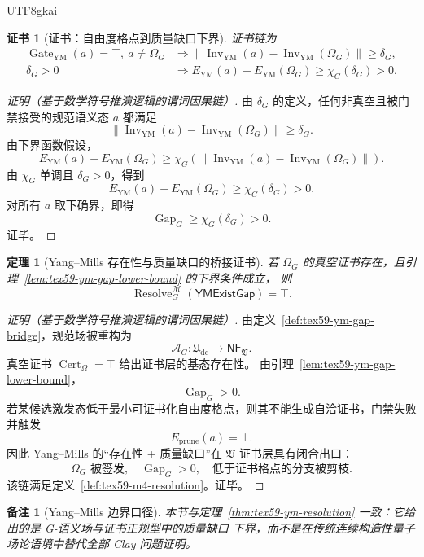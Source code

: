 \documentclass[12pt]{article}
\newtheorem{theorem}{定理}[section]
\newtheorem{remark}{备注}[section]
\newtheorem{Certificate}{证书}[section]
\newcommand{\Udc}{\mathfrak{U}_{\mathrm{dc}}}
\newcommand{\Vsys}{\mathfrak V}
\newcommand{\NF}{\mathsf{NF}}
\DeclareMathOperator{\Cert}{Cert}
\DeclareMathOperator{\Resolve}{Resolve}
\DeclareMathOperator{\Gate}{Gate}
\DeclareMathOperator{\Inv}{Inv}
\DeclareMathOperator{\Gap}{Gap}
\begin{document}
\begin{CJK*}{UTF8}{gkai}
\begin{Certificate}[证书：自由度格点到质量缺口下界]
\label{cert:tex59-ym-gap-lower-bound}
证书链为
\[
  \begin{aligned}
  \Gate_{\mathrm{YM}}(a)=\top,\ a\ne\Omega_G
  &\Longrightarrow
  \|\Inv_{\mathrm{YM}}(a)-\Inv_{\mathrm{YM}}(\Omega_G)\|\ge\delta_G,\\
  \delta_G>0
  &\Longrightarrow
  E_{\mathrm{YM}}(a)-E_{\mathrm{YM}}(\Omega_G)
  \ge\chi_G(\delta_G)>0.
  \end{aligned}
\]
\end{Certificate}

\begin{proof}[证明（基于数学符号推演逻辑的谓词因果链）]
由 \(\delta_G\) 的定义，任何非真空且被门禁接受的规范语义态 \(a\) 都满足
\[
  \|\Inv_{\mathrm{YM}}(a)-\Inv_{\mathrm{YM}}(\Omega_G)\|\ge\delta_G.
\]
由下界函数假设，
\[
  E_{\mathrm{YM}}(a)-E_{\mathrm{YM}}(\Omega_G)
  \ge
  \chi_G\left(
  \|\Inv_{\mathrm{YM}}(a)-\Inv_{\mathrm{YM}}(\Omega_G)\|
  \right).
\]
由 \(\chi_G\) 单调且 \(\delta_G>0\)，得到
\[
  E_{\mathrm{YM}}(a)-E_{\mathrm{YM}}(\Omega_G)\ge\chi_G(\delta_G)>0.
\]
对所有 \(a\) 取下确界，即得
\[
  \Gap_G\ge\chi_G(\delta_G)>0.
\]
证毕。
\end{proof}

\begin{theorem}[Yang--Mills 存在性与质量缺口的桥接证书]
\label{thm:tex59-m4-ym-gap}
若 \(\Omega_G\) 的真空证书存在，且引理~\ref{lem:tex59-ym-gap-lower-bound} 的下界条件成立，
则
\[
  \Resolve_G^{\mathcal M}(\mathsf{YMExistGap})=\top.
\]
\end{theorem}

\begin{proof}[证明（基于数学符号推演逻辑的谓词因果链）]
由定义~\ref{def:tex59-ym-gap-bridge}，规范场被重构为
\[
  \mathcal A_G:\Udc\to\NF_{\Vsys}.
\]
真空证书 \(\Cert_{\Omega}=\top\) 给出证书层的基态存在性。
由引理~\ref{lem:tex59-ym-gap-lower-bound}，
\[
  \Gap_G>0.
\]
若某候选激发态低于最小可证书化自由度格点，则其不能生成自洽证书，门禁失败并触发
\[
  E_{\mathrm{prune}}(a)=\bot.
\]
因此 Yang--Mills 的“存在性 + 质量缺口”在 \(\Vsys\) 证书层具有闭合出口：
\[
  \Omega_G\text{ 被签发},\quad
  \Gap_G>0,\quad
  \text{低于证书格点的分支被剪枝}.
\]
该链满足定义~\ref{def:tex59-m4-resolution}。证毕。
\end{proof}

\begin{remark}[Yang--Mills 边界口径]
本节与定理~\ref{thm:tex59-ym-resolution} 一致：它给出的是 G-语义场与证书正规型中的质量缺口
下界，而不是在传统连续构造性量子场论语境中替代全部 Clay 问题证明。
\end{remark}


\end{CJK*}
\end{document}
